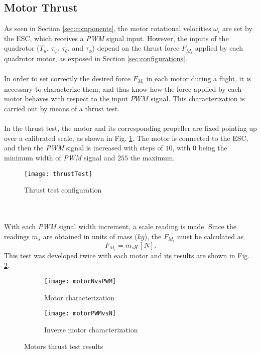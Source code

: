 \subsection{Motor Thrust}
As seen in Section \ref{sec:components}, the motor rotational velocities $\omega_{i}$ are set by the ESC, which receives a \textit{PWM} signal input. However, the inputs of the quadrotor ($T_u$, $\tau_\psi$, $\tau_\theta$, and $\tau_\phi$) depend on the thrust force $F_{M_{i}}$ applied by each quadrotor motor, as exposed in Section \ref{sec:configurations}.
\\\\
In order to set correctly the desired force $F_{M_{i}}$ in each motor during a flight, it is necessary to characterize them; and thus know how the force applied by each motor behaves with respect to the input $PWM$ signal. This characterization is carried out by means of a thrust test.
\\\\
In the thrust test, the motor and its corresponding propeller are fixed pointing up over a calibrated scale, as shown in Fig. \ref{fig:thrusttest}. The motor is connected to the ESC, and then the \textit{PWM} signal is increased with steps of $10$, with $0$ being the minimum width of \textit{PWM} signal and $255$ the maximum. 
\begin{figure}[h]
	\begin{center}
		\texttt{[image: thrustTest]}    
		\caption{Thrust test configuration} 
		\label{fig:thrusttest}
	\end{center}
\end{figure}
\\\\With each  \textit{PWM} signal width increment, a scale reading is made. Since the readings $m_{s}$ are obtained in units of mass ($kg$), the $F_{M_i}$ must be calculated as
\begin{equation}
F_{M_i} = m_{s}g\ [N].
\end{equation}
This test was developed twice with each motor and its results are shown in Fig. \ref{fig:motor}.
\begin{figure}[H]
\begin{subfigure}{.5\linewidth}
\centering
\texttt{[image: motorNvsPWM]}
\caption{Motor characterization}
\label{fig:motor}
\end{subfigure}%
\begin{subfigure}{.5\linewidth}
\centering
\texttt{[image: motorPWMvsN]}
\caption{Inverse motor characterization}
\label{fig:inversemotor}
\end{subfigure}
\caption{Motors thrust test results}
\label{fig:test}
\end{figure}

